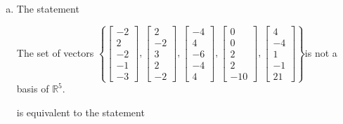 \begin{exerciseAnswer}
\begin{enumerate}[(a)]
\item The statement 
\begin{center}\begin{minipage}{0.8\textwidth}
 The set of vectors \( \left\{ \left[\begin{array}{c}
-2 \\
2 \\
-2 \\
-1 \\
-3
\end{array}\right] , \left[\begin{array}{c}
2 \\
-2 \\
3 \\
2 \\
-2
\end{array}\right] , \left[\begin{array}{c}
-4 \\
4 \\
-6 \\
-4 \\
4
\end{array}\right] , \left[\begin{array}{c}
0 \\
0 \\
2 \\
2 \\
-10
\end{array}\right] , \left[\begin{array}{c}
4 \\
-4 \\
1 \\
-1 \\
21
\end{array}\right] \right\} \)is not a basis of \(\mathbb{R}^5\). 
\end{minipage}\end{center}
     is equivalent to the statement 
\begin{center}\begin{minipage}{0.8\textwidth}
 The set of vectors \( \left\{ \left[\begin{array}{c}
-2 \\
2 \\
-2 \\
-1 \\
-3
\end{array}\right] , \left[\begin{array}{c}
2 \\
-2 \\

\end{array}
\end{minipage}
\end{center}
\end{enumerate}
\end{exerciseAnswer}
